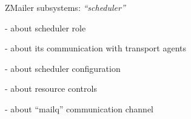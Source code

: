 \documentclass[a4paper,landscape]{slides}
\newcommand{\ZM}{ZMailer}
\begin{document}


\begin{slide}

\centerline{\large \ZM{} subsystems: {\it ``scheduler''}}

- about scheduler role

- about its communication with transport agents

- about scheduler configuration

- about resource controls

- about ``mailq'' communication channel

\vfill

\end{slide}

\end{document}
